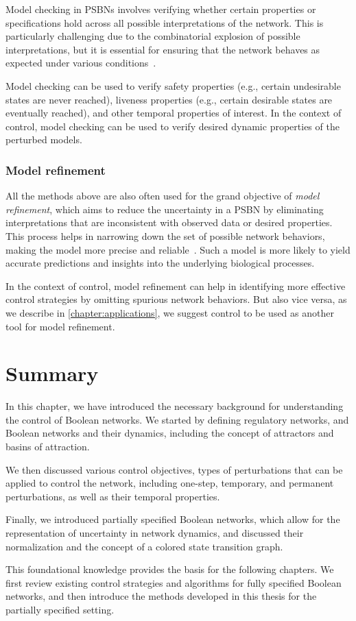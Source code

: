 Model checking in PSBNs involves verifying whether certain properties or specifications hold across all possible interpretations of the network. This is particularly challenging due to the combinatorial explosion of possible interpretations, but it is essential for ensuring that the network behaves as expected under various conditions~\cite{Benes2023}. 

Model checking can be used to verify safety properties (e.g., certain undesirable states are never reached), liveness properties (e.g., certain desirable states are eventually reached), and other temporal properties of interest. In the context of control, model checking can be used to verify desired dynamic properties of the perturbed models.

\subsubsection{Model refinement}

All the methods above are also often used for the grand objective of \emph{model refinement}, which aims to reduce the uncertainty in a PSBN by eliminating interpretations that are inconsistent with observed data or desired properties. This process helps in narrowing down the set of possible network behaviors, making the model more precise and reliable~\cite{Benes2023}. Such a model is more likely to yield accurate predictions and insights into the underlying biological processes.

In the context of control, model refinement can help in identifying more effective control strategies by omitting spurious network behaviors. But also vice versa, as we describe in \autoref{chapter:applications}, we suggest control to be used as another tool for model refinement.

\section{Summary}

In this chapter, we have introduced the necessary background for understanding the control of Boolean networks. We started by defining regulatory networks, and Boolean networks and their dynamics, including the concept of attractors and basins of attraction.

We then discussed various control objectives, types of perturbations that can be applied to control the network, including one-step, temporary, and permanent perturbations, as well as their temporal properties.

Finally, we introduced partially specified Boolean networks, which allow for the representation of uncertainty in network dynamics, and discussed their normalization and the concept of a colored state transition graph. 

This foundational knowledge provides the basis for the following chapters. We first review existing control strategies and algorithms for fully specified Boolean networks, and then introduce the methods developed in this thesis for the partially specified setting.